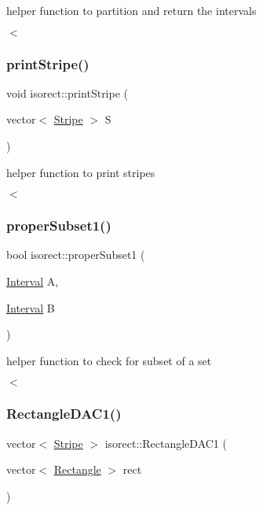 helper function to partition and return the intervals 

$<$ \mbox{\label{classisorect_abc81549a79ee630c09982f1b560eb644}} 
\subsubsection{\texorpdfstring{print\+Stripe()}{printStripe()}}
{\footnotesize\ttfamily void isorect\+::print\+Stripe (\begin{DoxyParamCaption}\item[{vector$<$ \hyperlink{classStripe}{Stripe} $>$}]{S }\end{DoxyParamCaption})}



helper function to print stripes 

$<$ \mbox{\label{classisorect_a6382fc3ab9d83e36fcb572b1a615fd5f}} 
\subsubsection{\texorpdfstring{proper\+Subset1()}{properSubset1()}}
{\footnotesize\ttfamily bool isorect\+::proper\+Subset1 (\begin{DoxyParamCaption}\item[{\hyperlink{classInterval}{Interval}}]{A,  }\item[{\hyperlink{classInterval}{Interval}}]{B }\end{DoxyParamCaption})}



helper function to check for subset of a set 

$<$ \mbox{\label{classisorect_af4d857e170d1935ef0e2a9b079bd7e57}} 
\subsubsection{\texorpdfstring{Rectangle\+D\+A\+C1()}{RectangleDAC1()}}
{\footnotesize\ttfamily vector$<$ \hyperlink{classStripe}{Stripe} $>$ isorect\+::\+Rectangle\+D\+A\+C1 (\begin{DoxyParamCaption}\item[{vector$<$ \hyperlink{classRectangle}{Rectangle} $>$}]{rect }\end{DoxyParamCaption})}



